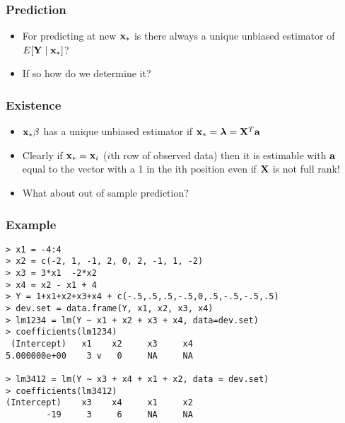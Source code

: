 \documentclass[handout]{beamer}
\begin{document}
\begin{frame} \frametitle{Prediction}
  \begin{itemize}
  \item   For predicting at new $\mathbf{x}_*$ is there always a unique unbiased
  estimator of $E[\mathbf{Y} \mid \mathbf{x}_*]$?
\item If so how do we determine it?

  \end{itemize}

\end{frame}
\begin{frame} \frametitle{Existence}
  \begin{itemize}
  \item  $\mathbf{x}_* \beta$ has a unique unbiased estimator if $\mathbf{x}_* =
    \boldsymbol{\lambda} = \mathbf{X}^T \mathbf{a}$ 
\item Clearly if $\mathbf{x}_* = \mathbf{x}_i$ ($i$th row of observed data) then it is
  estimable with $\mathbf{a}$ equal to the vector with a 1 in the ith position
  even if $\mathbf{X}$ is not full rank!
\item What about out of sample prediction?
\end{itemize}

\end{frame}


\begin{frame}[fragile] \frametitle{Example}
\begin{verbatim}
> x1 = -4:4
> x2 = c(-2, 1, -1, 2, 0, 2, -1, 1, -2)
> x3 = 3*x1  -2*x2
> x4 = x2 - x1 + 4
> Y = 1+x1+x2+x3+x4 + c(-.5,.5,.5,-.5,0,.5,-.5,-.5,.5)
> dev.set = data.frame(Y, x1, x2, x3, x4)
> lm1234 = lm(Y ~ x1 + x2 + x3 + x4, data=dev.set)
> coefficients(lm1234)
 (Intercept)   x1    x2     x3     x4 
5.000000e+00    3 v   0     NA     NA 

> lm3412 = lm(Y ~ x3 + x4 + x1 + x2, data = dev.set)
> coefficients(lm3412)
(Intercept)    x3    x4     x1     x2 
        -19     3     6     NA     NA 
\end{verbatim}
\end{frame}
\end{document}
